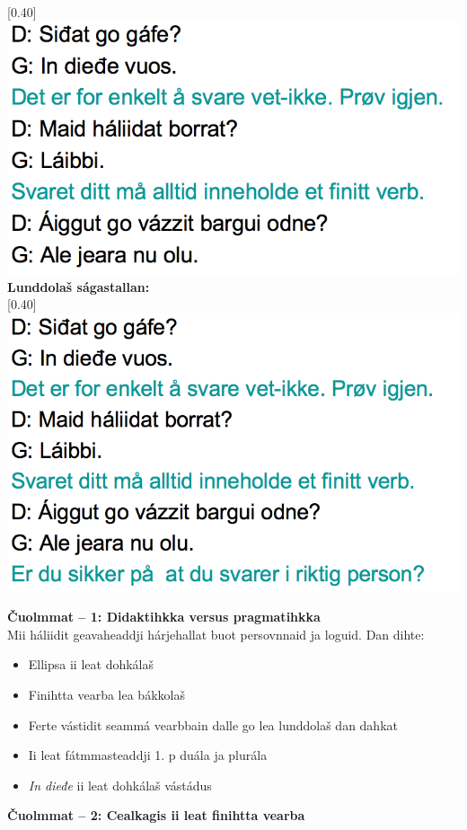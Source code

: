 \documentclass[landscape,norsk,11pt]{seminar}
\begin{document}
\begin{slide}
\scalebox{0.40}[0.40]{\includegraphics{img/lgiella5.png}} 
\newslide
\textbf{Lunddolaš ságastallan:} \\

\scalebox{0.40}[0.40]{\includegraphics{img/lgiella6.png}} 


\newslide
\textbf{Čuolmmat -- 1: Didaktihkka versus pragmatihkka} \\
Mii háliidit geavaheaddji hárjehallat buot persovnnaid ja loguid. Dan dihte:
\begin{itemize}
\item{Ellipsa ii leat dohkálaš}
\item{Finihtta vearba lea bákkolaš}
\item{Ferte vástidit seammá vearbbain dalle go lea lunddolaš dan dahkat}
\item{Ii leat fátmmasteaddji 1. p duála ja plurála }
\item{\textit{In dieđe} ii leat dohkálaš vástádus}
\end{itemize}

\newslide
\textbf{Čuolmmat -- 2: Cealkagis ii leat finihtta vearba} \\


\end{slide}
\end{document}
